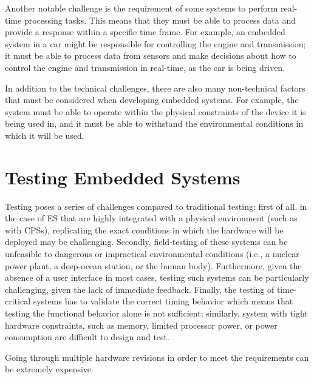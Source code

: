 Another notable challenge is the requirement of some systems to perform real-time processing tasks. This means that they must be able to process data and provide a response within a specific time frame. For example, an embedded system in a car might be responsible for controlling the engine and transmission; it must be able to process data from sensors and make decisions about how to control the engine and transmission in real-time, as the car is being driven.

In addition to the technical challenges, there are also many non-technical factors that must be considered when developing embedded systems. For example, the system must be able to operate within the physical constraints of the device it is being used in, and it must be able to withstand the environmental conditions in which it will be used.



\section{Testing Embedded Systems}
Testing \ess poses a series of challenges compared to traditional testing: first of all, in the case of ES that are highly integrated with a physical environment (such as with CPSs), replicating the exact conditions in which the hardware will be deployed may be challenging. Secondly, field-testing of these systems can be unfeasible to dangerous or impractical environmental conditions (i.e., a nuclear power plant, a deep-ocean station, or the human body). Furthermore, given the absence of a user interface in most cases, testing such systems can be particularly challenging, given the lack of immediate feedback. Finally, the testing of time-critical systems has to validate the correct timing behavior which means that testing the functional behavior alone is not sufficient; similarly, system with tight hardware constraints, such as memory, limited processor power, or power consumption are difficult to design and test.

Going through multiple hardware revisions in order to meet the requirements can be extremely expensive.

